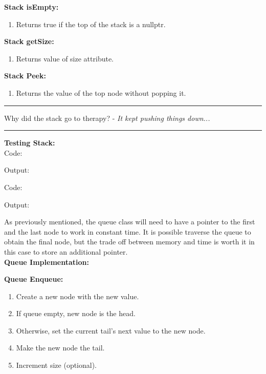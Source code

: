 \documentclass[letterpaper, 10pt]{article}
\begin{document}


\textbf{Stack isEmpty:}
\begin{enumerate}
    \item Returns true if the top of the stack is a nullptr.
\end{enumerate}
\textbf{Stack getSize:}
\begin{enumerate}
    \item Returns value of size attribute.
\end{enumerate}
\textbf{Stack Peek:}
\begin{enumerate}
    \item Returns the value of the top node without popping it.
\end{enumerate}
\hrule
\vspace{.25cm}
Why did the stack go to therapy? - \textit{It kept pushing things down...}\\
\hrule
\vspace{.25cm}
\textbf{Testing Stack: } \\
Code:

Output:

Code:

Output:

\noindent
As previously mentioned, the queue class will need to have a pointer to the first and the last node to work in constant time. It is possible traverse the queue to obtain the final node, but the trade off between memory and time is worth it in this case to store an additional pointer. \\
\textbf{Queue Implementation:}



\textbf{Queue Enqueue:}
\begin{enumerate}
    \item Create a new node with the new value.
    \item If queue empty, new node is the head.
    \item Otherwise, set the current tail's next value to the new node.
    \item Make the new node the tail.
    \item Increment size (optional).
\end{enumerate}


\end{document}
